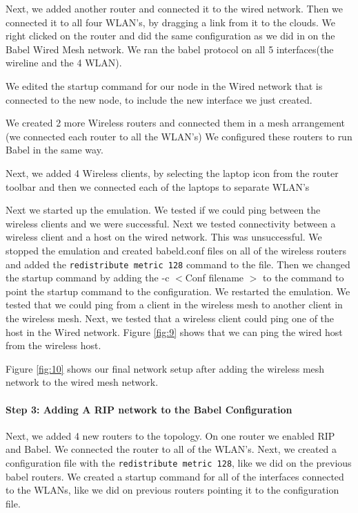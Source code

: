 \documentclass[main.tex]{subfiles}
\begin{document}
\noindent Next, we added another router and connected it to the wired network.  Then we connected it to all four WLAN's, by dragging a link from it to the clouds.
\noindent  We right clicked on the router and did the same configuration as we did in on the Babel Wired Mesh network.  We ran the babel protocol on all 5 interfaces(the wireline and the 4 WLAN).

\noindent We edited the startup command for our node in the Wired network that is connected to the new node, to include the new interface we just created.

\noindent We created 2 more Wireless routers and connected them in a mesh arrangement (we connected each router to all the WLAN's)
\noindent We configured these routers to run Babel in the same way.

\noindent Next, we added 4 Wireless clients, by selecting the laptop icon from the router toolbar and then we connected each of the laptops to separate WLAN's


\noindent Next we started up the emulation.
\noindent We tested if we could ping between the wireless clients and we were successful.  Next we tested connectivity between a wireless client and a host on the wired network.  This was unsuccessful.
\noindent We stopped the emulation and created babeld.conf files on all of the wireless routers and added the \texttt{redistribute metric 128} command to the file.  Then we changed the startup command by adding the -c $<$Conf filename $>$ to the command to point the startup command to the configuration.
\noindent We restarted the emulation.
\noindent We tested that we could ping from a client in the wireless mesh to another client in the wireless mesh.
\noindent Next, we tested that a wireless client could ping one of the host in the Wired network. Figure \ref{fig:9} shows that we can ping the wired host from the wireless host.

\noindent Figure \ref{fig:10} shows our final network setup after adding the wireless mesh network to the wired mesh network.

\paragraph{Step 3: Adding A RIP network to the Babel Configuration}
\hfill \break
\noindent Next, we added 4 new routers to the topology.  On one router we enabled RIP and Babel.  We connected the router to all of the WLAN's.
\noindent Next, we created a configuration file with the \texttt{redistribute metric 128}, like we did on the previous babel routers.  We created a startup command for all of the interfaces connected to the WLANs, like we did on previous routers pointing it to the configuration file.
\end{document}
